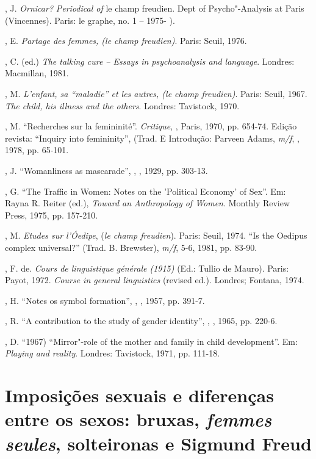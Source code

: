 , J. \emph{Ornicar?} \emph{Periodical of} le champ freudien. Dept
of Psycho"-Analysis at Paris  (Vincennes). Paris: le graphe, no. 1 --
1975- ).

, E. \emph{Partage des femmes, (le champ freudien)}.
Paris: Seuil, 1976.

, C. (ed.) \emph{The talking cure -- Essays in psychoanalysis and
language}. Londres: Macmillan, 1981.

, M. \emph{L'enfant, sa ``maladie'' et les autres, (le champ
freudien)}. Paris: Seuil, 1967. \emph{The child, his illness and the
others}. Londres: Tavistock, 1970.

, M. ``Recherches sur la femininité''. \emph{Critique}, ,
Paris, 1970, pp. 654-74. Edição revista: ``Inquiry into femininity'',
(Trad. E Introdução: Parveen Adams, \emph{m/f}, , 1978, pp. 65-101.

, J. ``Womanliness as mascarade'', \emph{}, , 1929, pp.
303-13.

, G. ``The Traffic in Women: Notes on the 'Political Economy' of
Sex''. Em: Rayna R. Reiter (ed.), \emph{Toward an Anthropology of
Women}. Monthly Review Press, 1975, pp. 157-210.

, M. \emph{Etudes sur l'Óedipe}, (\emph{le champ freudien}).
Paris: Seuil, 1974. ``Is the Oedipus complex universal?'' (Trad. B.
Brewster), \emph{m/f}, 5-6, 1981, pp. 83-90.

, F. de. \emph{Cours de linguistique générale (1915)} (Ed.:
Tullio de Mauro). Paris: Payot, 1972. \emph{Course in general
linguistics} (revised ed.). Londres; Fontana, 1974.

, H. ``Notes os symbol formation'', \emph{}, , 1957,
pp. 391-7.

, R. ``A contribution to the study of gender identity'',
\emph{}, , 1965, pp. 220-6.

, D. ``1967) ``Mirror"-role of the mother and family in child
development''. Em: \emph{Playing and reality}. Londres: Tavistock, 1971,
pp. 111-18.

\chapter*{Imposições sexuais e diferenças entre os sexos: bruxas,
\emph{femmes seules}, solteironas e Sigmund Freud}



